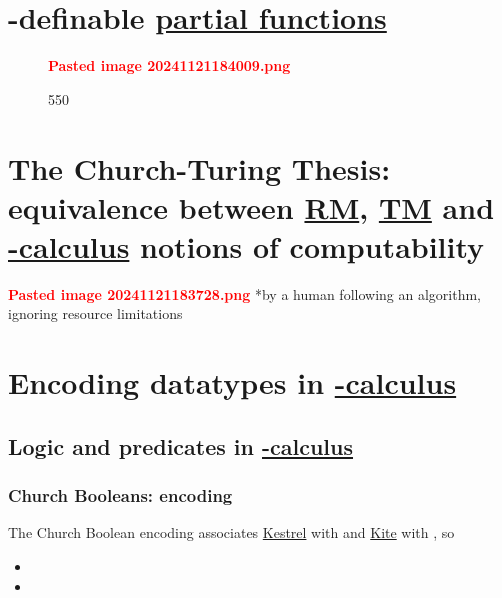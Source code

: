 \section*{\texorpdfstring{\iMbox{\lambda}-definable \ul{partial
functions}}{-definable partial functions}}

\begin{figure}
\centering
\textcolor{red}{\textbf{Pasted image 20241121184009.png}}
\caption{550}
\end{figure}

\section*{\texorpdfstring{The Church-Turing Thesis: equivalence between
\ul{RM}, \ul{TM} and \ul{\iMbox{\lambda}-calculus} notions of
computability}{The Church-Turing Thesis: equivalence between RM, TM and -calculus notions of computability}}

\textcolor{red}{\textbf{Pasted image 20241121183728.png}} *by a human
following an algorithm, ignoring resource limitations

\section*{\texorpdfstring{Encoding datatypes in
\ul{\iMbox{\lambda}-calculus}}{Encoding datatypes in -calculus}}

\subsection*{\texorpdfstring{Logic and predicates in
\ul{\iMbox{\lambda}-calculus}}{Logic and predicates in -calculus}}

\subsubsection*{\texorpdfstring{Church Booleans: encoding
}{Church Booleans: encoding }}

The Church Boolean encoding associates \ul{Kestrel} with
 and \ul{Kite} with , so

\begin{itemize}
\tightlist
\item
\item
\end{itemize}

